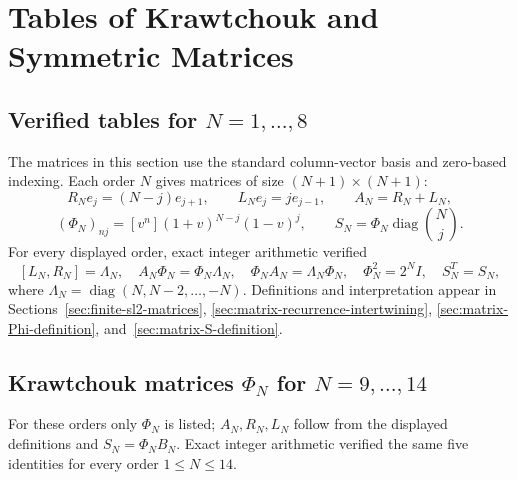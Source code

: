 \chapter{Tables of Krawtchouk and Symmetric Matrices}
\label{app:matrix-tables}
\section{Verified tables for $N=1,\ldots,8$}
The matrices in this section use the standard column-vector basis
and zero-based indexing. Each order $N$ gives matrices of size
$(N+1)\times(N+1)$:
\[
R_Ne_j=(N-j)e_{j+1},\qquad L_Ne_j=je_{j-1},\qquad A_N=R_N+L_N,
\]
\[
(\Phi_N)_{nj}=[v^n](1+v)^{N-j}(1-v)^j,\qquad
S_N=\Phi_N\operatorname{diag}\binom Nj.
\]
For every displayed order, exact integer arithmetic verified
\[
[L_N,R_N]=\Lambda_N,\quad
A_N\Phi_N=\Phi_N\Lambda_N,\quad
\Phi_NA_N=\Lambda_N\Phi_N,\quad
\Phi_N^2=2^NI,\quad S_N^T=S_N,
\]
where $\Lambda_N=\operatorname{diag}(N,N-2,\ldots,-N)$.
Definitions and interpretation appear in
Sections~\ref{sec:finite-sl2-matrices},
\ref{sec:matrix-recurrence-intertwining},
\ref{sec:matrix-Phi-definition}, and~\ref{sec:matrix-S-definition}.










\section{Krawtchouk matrices $\Phi_N$ for $N=9,\ldots,14$}
For these orders only $\Phi_N$ is listed; $A_N,R_N,L_N$ follow from the
displayed definitions and $S_N=\Phi_NB_N$. Exact integer arithmetic verified
the same five identities for every order $1\le N\le14$.


